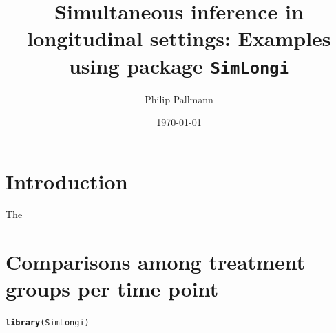 \documentclass[a4paper]{article}\usepackage[]{graphicx}\usepackage[]{color}
\title{Simultaneous inference in longitudinal settings: Examples using package \texttt{SimLongi}}
\date{\today}
\author{Philip Pallmann}
\makeatletter
\newcommand{\hlstd}[1]{\textcolor[rgb]{0.345,0.345,0.345}{#1}}%
\newcommand{\hlkwd}[1]{\textcolor[rgb]{0.737,0.353,0.396}{\textbf{#1}}}%
\newenvironment{kframe}{%
 \def\at@end@of@kframe{}%
 \ifinner\ifhmode%
  \def\at@end@of@kframe{\end{minipage}}%
  \begin{minipage}{\columnwidth}%
 \fi\fi%
 \def\FrameCommand##1{\hskip\@totalleftmargin \hskip-\fboxsep
 \colorbox{shadecolor}{##1}\hskip-\fboxsep
     \hskip-\linewidth \hskip-\@totalleftmargin \hskip\columnwidth}%
 \MakeFramed {\advance\hsize-\width
   \@totalleftmargin\z@ \linewidth\hsize
   \@setminipage}}%
 {\par\unskip\endMakeFramed%
 \at@end@of@kframe}
\newenvironment{knitrout}{}{} %
\makeatother
\begin{document}
\maketitle

\tableofcontents


\section{Introduction}
\label{Intro}

The 

\clearpage


\section{Comparisons among treatment groups per time point}
\label{GPT}

\begin{knitrout}
\color{fgcolor}\begin{kframe}
\begin{alltt}
\hlkwd{library}\hlstd{(SimLongi)}
\end{alltt}
\end{kframe}
\end{knitrout}


\clearpage

\end{document}
